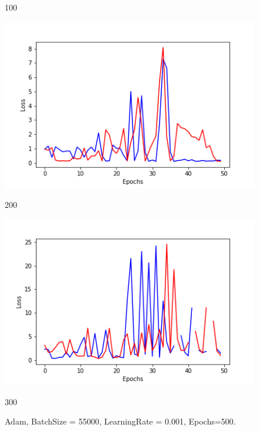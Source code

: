 \documentclass[20pt]{report}
\begin{document}
\begin{figure}[!htb]
	\caption{100}
\endminipage\hfill
{}
  \includegraphics[width=\linewidth]{4_200.png}
	\caption{200}
\endminipage\hfill
{}
  \includegraphics[width=\linewidth]{4_300.png}
	\caption{300}
\endminipage\hfill
 \caption{Adam, BatchSize = 55000, LearningRate = 0.001, Epochs=500.}
\end{figure}
\end{document}
